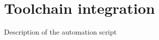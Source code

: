 \chapter{Toolchain integration}
\label{app:toolchain_integration}

Description of the automation script

